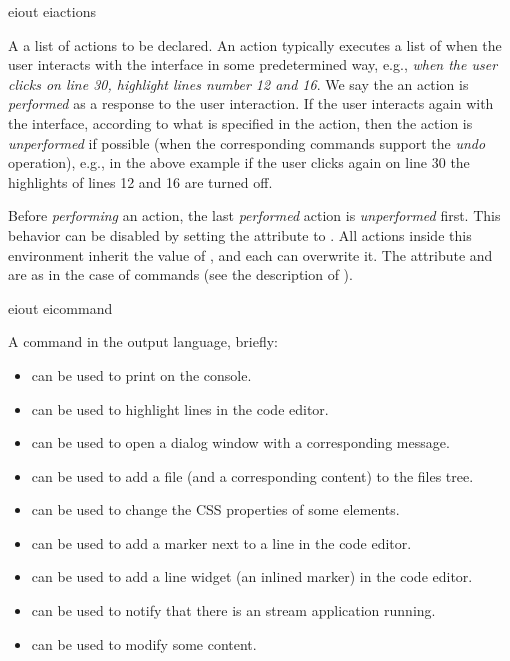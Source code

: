 \bigskip
\xmlstruct
{eiout}
{eiactions}
{%
%
  A a list of actions to be declared. An action typically executes a
  list of  when the user interacts with the
  interface in some predetermined way, e.g., \emph{when the user
    clicks on line 30, highlight lines number 12 and 16}. We say the
  an action is \emph{performed} as a response to the user interaction.
%
  If the user interacts again with the interface, according to what is
  specified in the action, then the action is \emph{unperformed} if
  possible (when the corresponding commands support the \emph{undo}
  operation), e.g., in the above example if the user clicks again on
  line 30 the highlights of lines 12 and 16 are turned off.

  Before \emph{performing} an action, the last \emph{performed} action
  is \emph{unperformed} first. This behavior can be disabled by
  setting the  attribute to
  . All actions inside this environment
  inherit the value of , and each can
  overwrite it.
% 
  The attribute  and  are
  as in the case of commands (see the description of
  ).
%
}


\bigskip
\xmlstruct
{eiout}
{eicommand}
{
A command in the \ei output language, briefly:
\begin{itemize}
\item {} can be used to print on the console.
%
\item {} can be used to highlight
  lines in the code editor.
%
\item {} can be used to open a dialog
  window with a corresponding message.
%
\item {} can be used to add a file (and a
  corresponding content) to the files tree.
%
\item {} can be used to change the CSS
  properties of some elements.
%
\item {} can be used to add a marker next
  to a line in the code editor.
%
\item {} can be used to add a line
  widget (an inlined marker) in the code editor.
%
\item {} can be used to notify that
  there is an stream application running.
%
\item {} can be used to modify some content.
%
\end{itemize}
}


